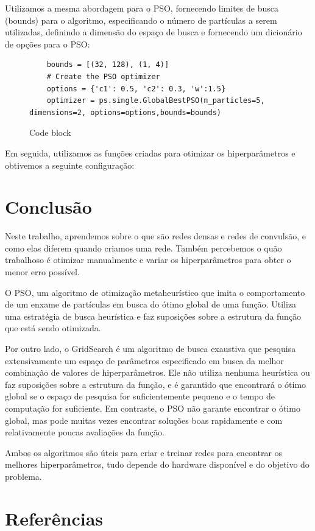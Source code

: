 \documentclass[10pt]{article}
\begin{document}
Utilizamos a mesma abordagem para o PSO, fornecendo limites de busca (bounds) para o 
algoritmo, especificando o número de partículas a serem utilizadas, definindo a dimensão do 
espaço de busca e fornecendo um dicionário de opções para o PSO:

\begin{figure}[htb]
  \begin{verbatim}
    bounds = [(32, 128), (1, 4)]
    # Create the PSO optimizer
    options = {'c1': 0.5, 'c2': 0.3, 'w':1.5}
    optimizer = ps.single.GlobalBestPSO(n_particles=5, dimensions=2, options=options,bounds=bounds)
  \end{verbatim}
  \caption{Code block}
  \label{fig:code_2}
\end{figure}

Em seguida, utilizamos as funções criadas para otimizar os hiperparâmetros e obtivemos 
a seguinte configuração:

\newpage
\section{Conclusão}\label{sec:conc}

Neste trabalho, aprendemos sobre o que são redes densas e redes de convulsão, 
e como elas diferem quando criamos uma rede. Também percebemos o quão trabalhoso é 
otimizar manualmente e variar os hiperparâmetros para obter o menor erro possível.

O PSO, um algoritmo de otimização metaheurístico que imita o comportamento 
de um enxame de partículas em busca do ótimo global de uma função. Utiliza uma estratégia de 
busca heurística e faz suposições sobre a estrutura da função que está sendo otimizada. 

Por outro lado, o GridSearch é um algoritmo de busca exaustiva que pesquisa extensivamente 
um espaço de parâmetros especificado em busca da melhor combinação de valores de hiperparâmetros. Ele não utiliza nenhuma heurística ou faz suposições sobre a estrutura da função, e é garantido que encontrará o ótimo global se o espaço de pesquisa for suficientemente pequeno e o tempo de computação for suficiente. Em contraste, o PSO não garante encontrar o ótimo global, mas pode muitas vezes encontrar soluções boas rapidamente e com relativamente poucas avaliações da função.

Ambos os algoritmos são úteis para criar e treinar redes para encontrar os melhores 
hiperparâmetros, tudo depende do hardware disponível e do objetivo do problema.

\section{Referências}\label{sec:sup-inf-utl}






\pagebreak
\end{document}
